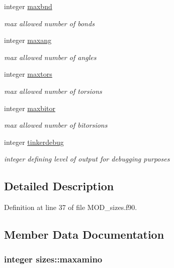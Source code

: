\begin{DoxyCompactItemize}
integer \hyperlink{classsizes_a0b1f98c2f45a8573fc896ea7b4cd18f6}{maxbnd}
\begin{DoxyCompactList}\small\item\em max allowed number of bonds \end{DoxyCompactList}\item 
integer \hyperlink{classsizes_a372954083ea1616653faa864a2e40840}{maxang}
\begin{DoxyCompactList}\small\item\em max allowed number of angles \end{DoxyCompactList}\item 
integer \hyperlink{classsizes_ab541bc9c15731a59c0fc11e5fde43e25}{maxtors}
\begin{DoxyCompactList}\small\item\em max allowed number of torsions \end{DoxyCompactList}\item 
integer \hyperlink{classsizes_afcf5f37881e4a77baf50cb1e39d8aa62}{maxbitor}
\begin{DoxyCompactList}\small\item\em max allowed number of bitorsions \end{DoxyCompactList}\item 
integer \hyperlink{classsizes_a8837e11d452843bc5176173e0d6000d0}{tinkerdebug}
\begin{DoxyCompactList}\small\item\em integer defining level of output for debugging purposes \end{DoxyCompactList}\end{DoxyCompactItemize}


\subsection{Detailed Description}


Definition at line 37 of file M\-O\-D\-\_\-sizes.\-f90.



\subsection{Member Data Documentation}
\hypertarget{classsizes_ae1efed52216c909b718f9ebfe7b5d16d}{
\subsubsection[{maxamino}]{\setlength{\rightskip}{0pt plus 5cm}integer sizes\-::maxamino}}\label{classsizes_ae1efed52216c909b718f9ebfe7b5d16d}


